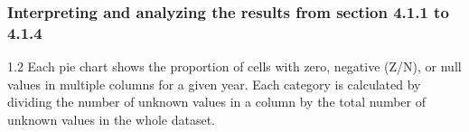 \documentclass[11pt]{article}
\begin{document}
\subsubsection{Interpreting and analyzing the results from section 4.1.1 to 4.1.4}
\vspace{0.25em}
\begin{center}
    \begin{minipage}[t]{\textwidth}
    \begin{tcolorbox}[colback=brickred!10, colframe=brickred!90, title=Note: How to correctly interpret the pie charts?, fonttitle=\bfseries, valign=center]
    \vfill
    \begin{spacing}{1.2}
    Each pie chart shows the proportion of cells with zero, negative (Z/N), or null values in multiple columns for a given year.
    Each category is calculated by dividing the number of unknown values in a column by the total number of unknown values 
    in the whole dataset.
    \end{spacing}
    \vfill
    \end{tcolorbox}
    \end{minipage}
\end{center}
\vspace{-0.5em}
\end{document}
